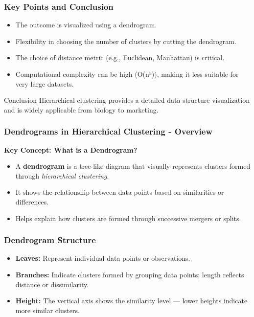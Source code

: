 \documentclass[aspectratio=169]{beamer}
\begin{document}
\begin{frame}
    \frametitle{Key Points and Conclusion}
    \begin{itemize}
        \item The outcome is visualized using a dendrogram.
        \item Flexibility in choosing the number of clusters by cutting the dendrogram.
        \item The choice of distance metric (e.g., Euclidean, Manhattan) is critical.
        \item Computational complexity can be high (O(n³)), making it less suitable for very large datasets.
    \end{itemize}
    \begin{block}{Conclusion}
        Hierarchical clustering provides a detailed data structure visualization and is widely applicable from biology to marketing.
    \end{block}
\end{frame}

\begin{frame}[fragile]
    \frametitle{Dendrograms in Hierarchical Clustering - Overview}
    \textbf{Key Concept: What is a Dendrogram?}
    \begin{itemize}
        \item A \textbf{dendrogram} is a tree-like diagram that visually represents clusters formed through \textit{hierarchical clustering}.
        \item It shows the relationship between data points based on similarities or differences.
        \item Helps explain how clusters are formed through successive mergers or splits.
    \end{itemize}
\end{frame}

\begin{frame}[fragile]
    \frametitle{Dendrogram Structure}
    \begin{itemize}
        \item \textbf{Leaves:} Represent individual data points or observations.
        \item \textbf{Branches:} Indicate clusters formed by grouping data points; length reflects distance or dissimilarity.
        \item \textbf{Height:} The vertical axis shows the similarity level — lower heights indicate more similar clusters.
    \end{itemize}
\end{frame}
\end{document}
